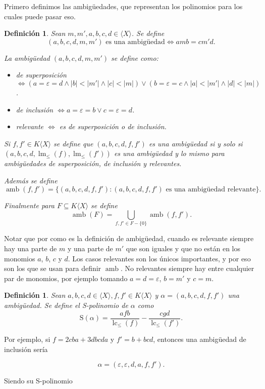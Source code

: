 \documentclass[12pt]{report}
\theoremstyle{customstyle}
\newtheorem{definition}[theorem]{Definición}
\theoremstyle{factstyle}
\DeclareMathOperator{\lm}{lm}
\DeclareMathOperator{\lc}{lc}
\DeclareMathOperator{\amb}{amb}
\renewcommand{\S}{\text{S}}
\begin{document}
Primero definimos las ambigüedades, que representan los polinomios para los cuales puede pasar eso.

\begin{definition}
  Sean $m, m', a, b, c, d ∈ ⟨X⟩$. Se define
  \[ (a, b, c, d, m, m')\text{ es una ambigüedad} ⇔ amb = cm'd \text{.}\]

  La ambigüedad $(a, b, c, d, m, m')$ se define como:
  \begin{itemize}
    \item de superposición $⇔ (a = ε = d ∧ |b| < |m'| ∧ |c| < |m|) ∨ (b = ε = c ∧ |a| < |m'| ∧ |d| < |m|)$.
    \item de inclusión $⇔ a = ε = b ∨ c = ε = d$.
    \item relevante $⇔$ es de superposición o de inclusión.
  \end{itemize}

  Si $f, f' ∈ K⟨X⟩$ se define que $(a, b, c, d, f, f')$ es una ambigüedad si y solo si $(a, b, c, d, \lm_≤{(f)}, \lm_≤{(f')})$ es una ambigüedad y lo mismo para ambigüedades de superposición, de inclusión y relevantes.

  Además se define
  \[ \amb(f, f') = \{(a, b, c, d, f, f') : (a, b, c, d, f, f')\text{ es una ambigüedad relevante}\} \text{.} \]

  Finalmente para $F ⊆ K⟨X⟩$ se define
  \[ \amb(F) = ⋃_{f, f' ∈ F - \{0\}}{\amb(f, f')} \text{.} \]

\end{definition}

Notar que por como es la definición de ambigüedad, cuando es relevante siempre hay una parte de $m$ y una parte de $m'$ que son iguales y que no están en los monomios $a$, $b$, $c$ y $d$. Los casos relevantes son los únicos importantes, y por eso son los que se usan para definir $\amb$. No relevantes siempre hay entre cualquier par de monomios, por ejemplo tomando $a = d = ε$, $b = m'$ y $c = m$.

\begin{definition}
  Sean $a, b, c, d ∈ ⟨X⟩, f, f' ∈ K⟨X⟩$ y $α = (a, b, c, d, f, f')$ una ambigüedad. Se define el S-polinomio de $α$ como
  \[ \S(α) = \frac{afb}{\lc_≤{(f)}} - \frac{cgd}{\lc_≤{(f')}} \text{.}\]
\end{definition}

Por ejemplo, si $f = 2 cba + 3 dbcda$ y $f' = b + bcd$, entonces una ambigüedad de inclusión sería

\[α = (ε, ε, d, a, f, f') \text{.} \]

\noindent Siendo su S-polinomio
\end{document}
